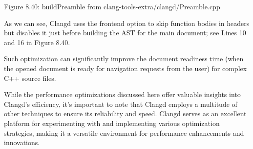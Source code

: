 \begin{center}
Figure 8.40: buildPreamble from clang-tools-extra/clangd/Preamble.cpp
\end{center}

As we can see, Clangd uses the frontend option to skip function bodies in headers but disables it just before building the AST for the main document; see Lines 10 and 16 in Figure 8.40.

Such optimization can significantly improve the document readiness time (when the opened document is ready for navigation requests from the user) for complex C++ source files.

While the performance optimizations discussed here offer valuable insights into Clangd's efficiency, it's important to note that Clangd employs a multitude of other techniques to ensure its reliability and speed. Clangd serves as an excellent platform for experimenting with and implementing various optimization strategies, making it a versatile environment for performance enhancements and innovations.












































